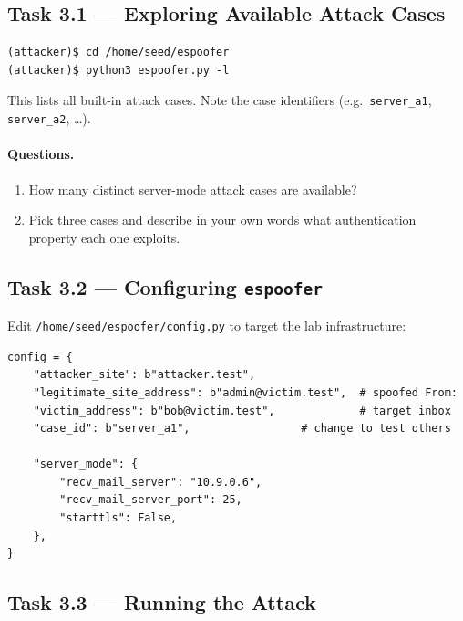 \documentclass[11pt]{article}
\begin{document}
\subsection{Task 3.1 --- Exploring Available Attack Cases}

\begin{listing}[H]
\begin{verbatim}
(attacker)$ cd /home/seed/espoofer
(attacker)$ python3 espoofer.py -l
\end{verbatim}
\end{listing}

This lists all built-in attack cases. Note the case identifiers
(e.g.\ \texttt{server\_a1}, \texttt{server\_a2}, \ldots).

\paragraph{Questions.}
\begin{enumerate}[noitemsep]
  \item How many distinct server-mode attack cases are available?
  \item Pick three cases and describe in your own words what
    authentication property each one exploits.
\end{enumerate}

\subsection{Task 3.2 --- Configuring \texttt{espoofer}}

Edit \texttt{/home/seed/espoofer/config.py} to target the lab
infrastructure:

\begin{listing}[H]
\begin{verbatim}
config = {
    "attacker_site": b"attacker.test",
    "legitimate_site_address": b"admin@victim.test",  # spoofed From:
    "victim_address": b"bob@victim.test",             # target inbox
    "case_id": b"server_a1",                 # change to test others

    "server_mode": {
        "recv_mail_server": "10.9.0.6",
        "recv_mail_server_port": 25,
        "starttls": False,
    },
}
\end{verbatim}
\end{listing}

\subsection{Task 3.3 --- Running the Attack}
\end{document}
